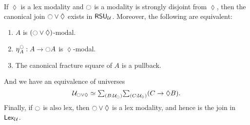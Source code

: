 \begin{thm}\label{thm:join}
  If $\lozenge$ is a lex modality and ${\ocircle}$ is a modality is strongly disjoint from $\lozenge$, then the canonical join ${\ocircle}\lor\lozenge$ exists in $\mathsf{RSU}_{\mathcal{U}}$.
  Moreover, the following are equivalent:
  \begin{enumerate}
  \item $A$ is $({\ocircle}\lor\lozenge)$-modal.\label{item:j1}
  \item ${\eta_{}}^{\ocircle}_A : A \to {\ensuremath{\ocircle}} A$ is $\lozenge$-modal.\label{item:j2}
  \item The canonical fracture square of $A$ is a pullback.\label{item:j3}
  \end{enumerate}
  And we have an equivalence of universes
  \begin{equation}
    \UU_{\modal\lor\lozenge} \simeq \sm{B:\UU_\modal}{C:\UU_\lozenge} (C \to \lozenge B).\label{eq:gluing0}
  \end{equation}
  Finally, if ${\ocircle}$ is also lex, then ${\ocircle}\lor\lozenge$ is a lex modality, and hence is the join in $\mathsf{Lex}_{\mathcal{U}}$.
\end{thm}
